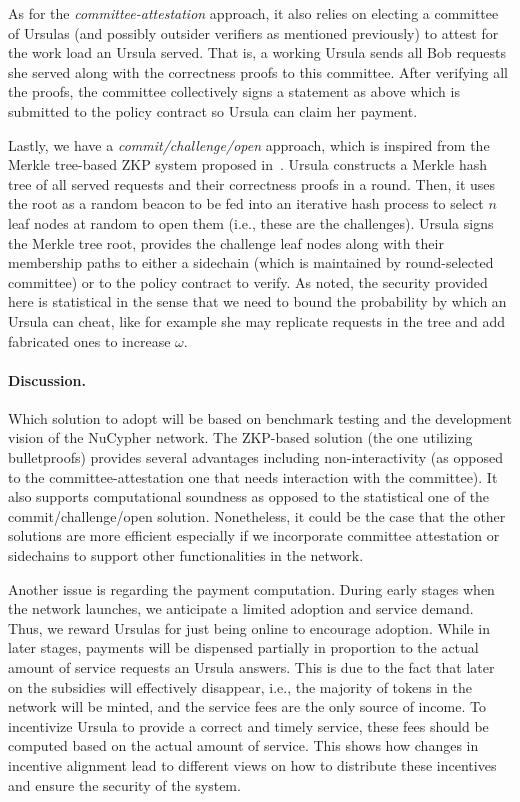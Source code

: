 \documentclass{llncs}
\begin{document}
As for the \emph{committee-attestation} approach, it also relies on electing a committee of Ursulas (and possibly outsider verifiers as mentioned previously) to attest for the work load an Ursula served. That is, a working Ursula sends all Bob requests she served along with the correctness proofs to this committee. After verifying all the proofs, the committee collectively signs a statement as above which is submitted to the policy contract so Ursula can claim her payment.


Lastly, we have a \emph{commit/challenge/open} approach, which is inspired from the Merkle tree-based ZKP system proposed in~\cite{dottling19}. Ursula constructs a Merkle hash tree of all served requests and their correctness proofs in a round. Then, it uses the root as a random beacon to be fed into an iterative hash process to select $n$ leaf nodes at random to open them (i.e., these are the challenges). Ursula signs the Merkle tree root, provides the challenge leaf nodes along with their membership paths to either a sidechain (which is maintained by round-selected committee) or to the policy contract to verify. As noted, the security provided here is statistical in the sense that we need to bound the probability by which an Ursula can cheat, like for example she may replicate requests in the tree and add fabricated ones to increase $\omega$. 


\paragraph{Discussion.} Which solution to adopt will be based on benchmark testing and the development vision of the NuCypher network. The ZKP-based solution (the one utilizing bulletproofs) provides several advantages including non-interactivity (as opposed to the committee-attestation one that needs interaction with the committee). It also supports computational soundness as opposed to the statistical one of the commit/challenge/open solution. Nonetheless, it could be the case that the other solutions are more efficient especially if we incorporate committee attestation or sidechains to support other functionalities in the network. 


Another issue is regarding the payment computation. During early stages when the network launches, we anticipate a limited adoption and service demand. Thus, we reward Ursulas for just being online to encourage adoption. While in later stages, payments will be dispensed partially in proportion to the actual amount of service requests an Ursula answers. This is due to the fact that later on the subsidies will effectively disappear, i.e., the majority of tokens in the network will be minted, and the service fees are the only source of income. To incentivize Ursula to provide a correct and timely service, these fees should be computed based on the actual amount of service. This shows how changes in incentive alignment lead to different views on how to distribute these incentives and ensure the security of the system.
\end{document}
